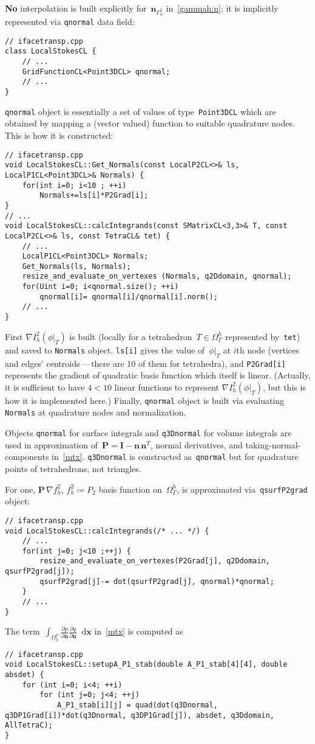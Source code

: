 \documentclass[12pt]{article}
\newcommand{\vect}[1]{\boldsymbol{\mathbf{#1}}}
\newcommand*\diff{\mathop{}\!\mathrm{d}}
\begin{document}
\textbf{No} interpolation is built explicitly for~$\vect n_{\Gamma_h^2}$ in~\eqref{gammah:n}; it is implicitly represented via \texttt{qnormal} data field:
\begin{lstlisting}
// ifacetransp.cpp
class LocalStokesCL {
	// ...
	GridFunctionCL<Point3DCL> qnormal;
	// ...
}
\end{lstlisting}
\texttt{qnormal} object is essentially a set of values of type~\texttt{Point3DCL} which are obtained by mapping a (vector valued) function to suitable quadrature nodes. This is how it is constructed:   
\begin{lstlisting}
// ifacetransp.cpp
void LocalStokesCL::Get_Normals(const LocalP2CL<>& ls, LocalP1CL<Point3DCL>& Normals) {
	for(int i=0; i<10 ; ++i)
		Normals+=ls[i]*P2Grad[i];
}
// ...
void LocalStokesCL::calcIntegrands(const SMatrixCL<3,3>& T, const LocalP2CL<>& ls, const TetraCL& tet) {
	// ...
	LocalP1CL<Point3DCL> Normals;
	Get_Normals(ls, Normals);
	resize_and_evaluate_on_vertexes (Normals, q2Ddomain, qnormal);
	for(Uint i=0; i<qnormal.size(); ++i) 
		qnormal[i]= qnormal[i]/qnormal[i].norm();
	// ...
}
\end{lstlisting}
First $\nabla I_h^2(\phi|_T)$ is built (locally for a tetrahedron~$T \in \Omega_\Gamma^h$ represented by~\texttt{tet}) and saved to \texttt{Normals} object. \texttt{ls[i]} gives the value of~$\phi|_T$ at $i$th node (vertices and edges' centroids\,---\,there are 10 of them for tetrahedra), and \texttt{P2Grad[i]} represents the gradient of quadratic basis function which itself is linear. (Actually, it is sufficient to have $4 < 10$ linear functions to represent $\nabla I_h^2(\phi|_T)$, but this is how it is implemented here.) Finally, \texttt{qnormal} object is built via evaluating \texttt{Normals} at quadrature nodes and normalization.

Objects \texttt{qnormal} for surface integrals and \texttt{q3Dnormal} for volume integrals are used in approximation of~$\vect P = \vect I - \vect n\,\vect n^T$, normal derivatives, and taking-normal-components in~\eqref{mtx}. \texttt{q3Dnormal} is constructed as~\texttt{qnormal} but for quadrature points of tetrahedrons, not triangles. 

For one, $\vect P\,\nabla f_h^2$, $f_h^2 \coloneqq P_2$ basis function on~$\Omega_\Gamma^h$, is approximated via~\texttt{qsurfP2grad} object:
\begin{lstlisting}
// ifacetransp.cpp
void LocalStokesCL::calcIntegrands(/* ... */) {
    // ...
    for(int j=0; j<10 ;++j) {
		resize_and_evaluate_on_vertexes(P2Grad[j], q2Ddomain, qsurfP2grad[j]);
		qsurfP2grad[j]-= dot(qsurfP2grad[j], qnormal)*qnormal;
	}
	// ...
}
\end{lstlisting}  
The term~$\int_{\Omega^{\Gamma}_h} \frac{\partial p}{\partial\vect n} \frac{\partial q}{\partial\vect n} \diff{\vect x}$ in~\eqref{mtx} is computed as
\begin{lstlisting}
// ifacetransp.cpp
void LocalStokesCL::setupA_P1_stab(double A_P1_stab[4][4], double absdet) {
	for (int i=0; i<4; ++i) 
		for (int j=0; j<4; ++j) 
			A_P1_stab[i][j] = quad(dot(q3Dnormal, q3DP1Grad[i])*dot(q3Dnormal, q3DP1Grad[j]), absdet, q3Ddomain, AllTetraC);
}
\end{lstlisting}
\end{document}
